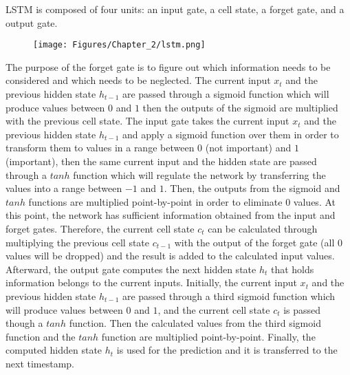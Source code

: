 LSTM is composed of four units: an input gate, a cell state, a forget gate, and a output gate.
\begin{figure}[h!]
	\begin{center}
		\texttt{[image: Figures/Chapter\_2/lstm.png]}
	\end{center}
	\label{lstm}
\end{figure}
The purpose of the forget gate is to figure out which information needs to be considered and which needs to be neglected.
The current input \(x_t\) and the previous hidden state \(h_{t-1}\) are passed through a sigmoid function which will produce values between \(0\) and \(1\) then the outputs of the sigmoid are multiplied with the previous cell state.
The input gate takes the current input \(x_t\) and the previous hidden state \(h_{t-1}\) and apply a sigmoid function over them in order to transform them to values in a range between \(0\) (not important) and \(1\) (important), then the same current input and the hidden state are passed through a \(tanh\) function which will regulate the network by transferring the values into a range between \(-1\) and \(1\).
Then, the outputs from the sigmoid and \(tanh\) functions are multiplied point-by-point in order to eliminate \(0\) values.
At this point, the network has sufficient information obtained from the input and forget gates.
Therefore, the current cell state \(c_t\) can be calculated through multiplying the previous cell state \(c_{t-1}\) with the output of the forget gate (all 0 values will be dropped) and the result is added to the calculated input values.
Afterward, the output gate computes the next hidden state \(h_t\) that holds information belongs to the current inputs.
Initially, the current input \(x_t\) and the previous hidden state \(h_{t-1}\) are passed through a third sigmoid function which will produce values between 
\(0\) and \(1\), and the current cell state \(c_t\) is passed though a \(tanh\) function.
Then the calculated values from the third sigmoid function and the \(tanh\) function are multiplied point-by-point.
Finally, the computed hidden state \(h_t\) is used for the prediction and it is transferred to the next timestamp.
